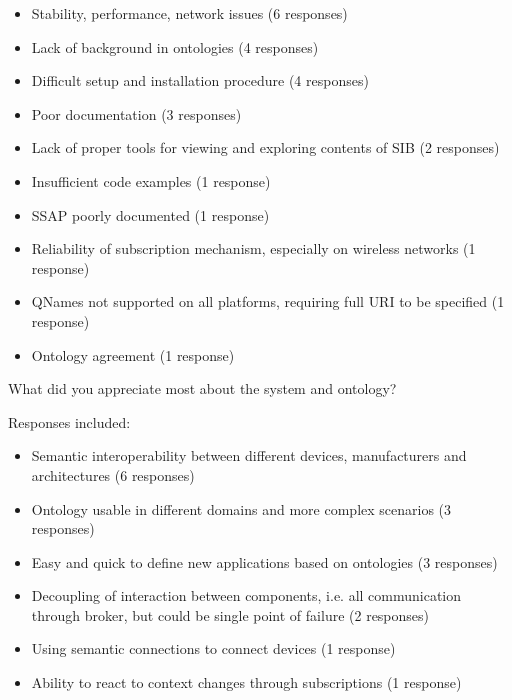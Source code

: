 \begin{itemize}
	\item Stability, performance, network issues (6 responses)
	\item Lack of background in ontologies (4 responses)
	\item Difficult setup and installation procedure (4 responses)
	\item Poor documentation (3 responses)
	\item Lack of proper tools for viewing and exploring contents of \ac{SIB} (2 responses)
	\item Insufficient code examples (1 response)
	\item \ac{SSAP} poorly documented (1 response)


	\item Reliability of subscription mechanism, especially on wireless networks (1 response)
	\item QNames not supported on all platforms, requiring full \ac{URI} to be specified (1 response)
	\item Ontology agreement (1 response)

\end{itemize}
\vspace{0.5cm}


\begin{cdquestion}
	What did you appreciate most about the system and ontology?
\end{cdquestion}

Responses included:

\begin{itemize}
	\item Semantic interoperability between different devices, manufacturers and architectures (6 responses)
	\item Ontology usable in different domains and more complex scenarios (3 responses)
	\item Easy and quick to define new applications based on ontologies (3 responses)
	\item Decoupling of interaction between components, i.e. all communication through broker, but could be single point of failure (2 responses)
	\item Using semantic connections to connect devices (1 response)
	\item Ability to react to context changes through subscriptions (1 response)
\end{itemize}


